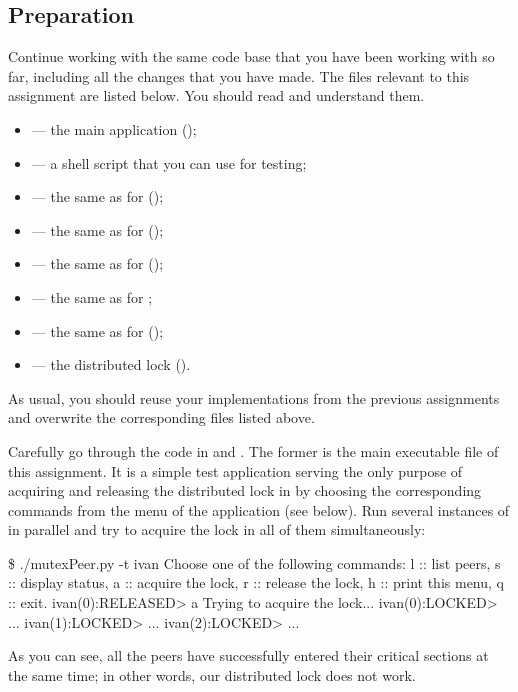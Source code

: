 \documentclass[a4paper]{article}
\begin{document}
\subsection{Preparation}
Continue working with the same code base that you have been working with so far,
including all the changes that you have made. The files relevant to this
assignment are listed below. You should read and understand them.
\begin{itemize}

  \item {} --- the main application (\leave);

  \item {} --- a shell script that you can use for testing;

  \item {} --- the same as for
   (\leave);

  \item {} --- the same as for 
  (\overwrite);

  \item {} --- the same as for 
  (\overwrite);

  \item {} --- the same as for ;

  \item {} --- the same as for 
  (\overwrite);

  \item {} --- the distributed
  lock (\fix).

\end{itemize}
As usual, you should reuse your implementations from the previous assignments
and overwrite the corresponding files listed above.

Carefully go through the code in  and
. The former is the main executable file of this
assignment. It is a simple test application serving the only purpose of
acquiring and releasing the distributed lock in  by
choosing the corresponding commands from the menu of the application (see
below). Run several instances of  in parallel and try to
acquire the lock in all of them simultaneously:
\begin{shell}
\$ ./mutexPeer.py -t ivan
Choose one of the following commands:
    l  ::  list peers,
    s  ::  display status,
    a  ::  acquire the lock,
    r  ::  release the lock,
    h  ::  print this menu,
    q  ::  exit.
ivan(0):RELEASED> a
Trying to acquire the lock...
ivan(0):LOCKED>
...
ivan(1):LOCKED>
...
ivan(2):LOCKED>
...
\end{shell}
As you can see, all the peers have successfully entered their critical sections
at the same time; in other words, our distributed lock does not work.
\end{document}

